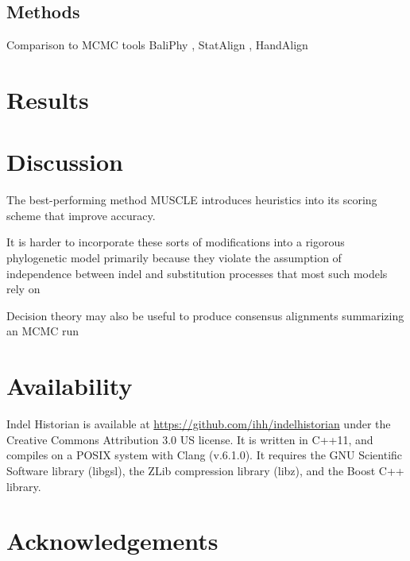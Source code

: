 \documentclass{bioinfo}
\begin{document}
\begin{methods}
\section{Methods}

\citep{Westesson2012-zg}

\end{methods}



Comparison to MCMC tools
BaliPhy \citep{RedelingsSuchard2005,RedelingsSuchard2007,Redelings2014},
StatAlign \citep{NovakEtAl2008,HermanEtAl2014},
HandAlign \citep{WestessonBarquistHolmes2012}


\section{Results}



\section{Discussion}



The best-performing method MUSCLE introduces heuristics into its scoring scheme
that improve accuracy.

It is harder to incorporate these sorts of modifications into a rigorous phylogenetic model
primarily because they violate the assumption of independence
between indel and substitution processes
that most such models rely on

Decision theory may also be useful to produce consensus alignments summarizing an MCMC run \citep{HermanEtAl2015}



\section{Availability}

Indel Historian is available at \url{https://github.com/ihh/indelhistorian} under the Creative Commons Attribution 3.0 US license. It is written in C++11, and compiles on a POSIX system with Clang (v.6.1.0). It requires the GNU Scientific Software library (libgsl), the ZLib compression library (libz), and the Boost C++ library.

\section*{Acknowledgements}
\end{document}
